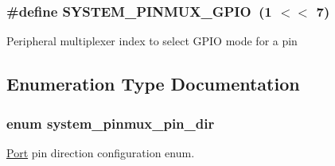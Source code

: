 \subsubsection[{S\+Y\+S\+T\+E\+M\+\_\+\+P\+I\+N\+M\+U\+X\+\_\+\+G\+P\+I\+O}]{\setlength{\rightskip}{0pt plus 5cm}\#define S\+Y\+S\+T\+E\+M\+\_\+\+P\+I\+N\+M\+U\+X\+\_\+\+G\+P\+I\+O~(1 $<$$<$ 7)}\label{group__asfdoc__sam0__system__pinmux__group_gaf212e7bc2a29cb57ab7b1130e4404a6b}
Peripheral multiplexer index to select G\+P\+I\+O mode for a pin 

\subsection{Enumeration Type Documentation}
\hypertarget{group__asfdoc__sam0__system__pinmux__group_gaef5ed797ec6ce6e7f2ca4bafd3f77df2}{}
\subsubsection[{system\+\_\+pinmux\+\_\+pin\+\_\+dir}]{\setlength{\rightskip}{0pt plus 5cm}enum {\bf system\+\_\+pinmux\+\_\+pin\+\_\+dir}}\label{group__asfdoc__sam0__system__pinmux__group_gaef5ed797ec6ce6e7f2ca4bafd3f77df2}


\hyperlink{struct_port}{Port} pin direction configuration enum. 

